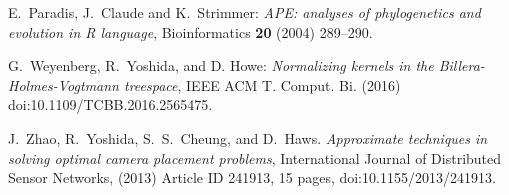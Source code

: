 \documentclass[12pt]{extarticle}
\numberwithin{theorem}{section}
\begin{document}
\begin{thebibliography}{10}
 E.~Paradis, J.~Claude and K.~Strimmer: {\em A{PE}:
    analyses of phylogenetics and evolution in  {R} language},
  Bioinformatics {\bf 20} (2004) 289--290.


 G.~Weyenberg, R.~Yoshida, and D. Howe: {\em
    Normalizing kernels in the {B}illera-{H}olmes-{V}ogtmann
    treespace}, IEEE ACM T. Comput. Bi. (2016) doi:10.1109/TCBB.2016.2565475.

 J.~Zhao, R.~Yoshida, S.~S.~Cheung, and D.~Haws.  {\em
    Approximate techniques in solving optimal camera placement
    problems}, International Journal of Distributed Sensor Networks,
  (2013) Article ID 241913, 15 pages, doi:10.1155/2013/241913.

\end{thebibliography}
\end{document}
